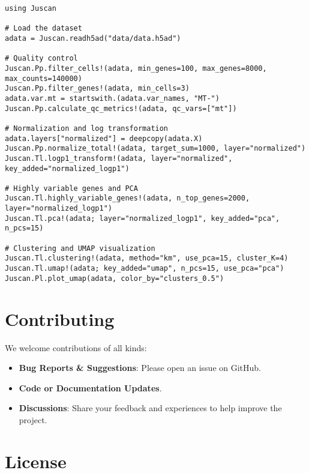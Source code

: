 \documentclass[oneside]{memoir}
\begin{document}
\begin{verbatim}
using Juscan

# Load the dataset
adata = Juscan.readh5ad("data/data.h5ad")

# Quality control
Juscan.Pp.filter_cells!(adata, min_genes=100, max_genes=8000, max_counts=140000)
Juscan.Pp.filter_genes!(adata, min_cells=3)
adata.var.mt = startswith.(adata.var_names, "MT-")
Juscan.Pp.calculate_qc_metrics!(adata, qc_vars=["mt"])

# Normalization and log transformation
adata.layers["normalized"] = deepcopy(adata.X)
Juscan.Pp.normalize_total!(adata, target_sum=1000, layer="normalized")
Juscan.Tl.logp1_transform!(adata, layer="normalized", key_added="normalized_logp1")

# Highly variable genes and PCA
Juscan.Tl.highly_variable_genes!(adata, n_top_genes=2000, layer="normalized_logp1")
Juscan.Tl.pca!(adata; layer="normalized_logp1", key_added="pca", n_pcs=15)

# Clustering and UMAP visualization
Juscan.Tl.clustering!(adata, method="km", use_pca=15, cluster_K=4)
Juscan.Tl.umap!(adata; key_added="umap", n_pcs=15, use_pca="pca")
Juscan.Pl.plot_umap(adata, color_by="clusters_0.5")
\end{verbatim}



\section{Contributing}



\label{2097515079362899065}{}


We welcome contributions of all kinds:



\begin{itemize}
\item \textbf{Bug Reports \& Suggestions}: Please open an issue on GitHub.


\item \textbf{Code or Documentation Updates}.


\item \textbf{Discussions}: Share your feedback and experiences to help improve the project.

\end{itemize}


\section{License}
\end{document}
